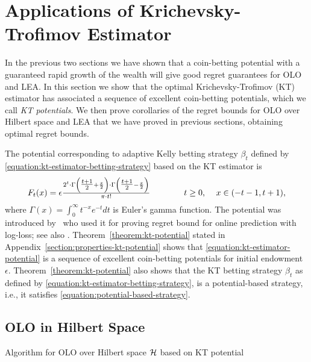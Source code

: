 \section{Applications of Krichevsky-Trofimov Estimator}
\label{section:kt-estimator}

In the previous two sections we have shown that a coin-betting potential with a
guaranteed rapid growth of the wealth will give good regret guarantees for
\ac{OLO} and \ac{LEA}. In this section we show that the optimal
Krichevsky-Trofimov (KT) estimator has associated a sequence of excellent
coin-betting potentials, which we call \emph{KT potentials}. We then prove
corollaries of the regret bounds for \ac{OLO} over Hilbert space and \ac{LEA}
that we have proved in previous sections, obtaining optimal regret bounds.

The potential corresponding to adaptive Kelly betting strategy
$\beta_t$ defined by \eqref{equation:kt-estimator-betting-strategy}
based on the KT estimator is
\begin{equation}
\label{equation:kt-estimator-potential}
F_t(x) = \epsilon \tfrac{2^t \cdot \Gamma \left( \tfrac{t+1}{2} + \frac{x}{2} \right) \cdot \Gamma \left( \tfrac{t+1}{2} - \frac{x}{2} \right)}{\pi \cdot t!}
\qquad \qquad \text{$t \ge 0$, \quad $x \in \left(-t-1, t+1\right)$,}
\end{equation}
where $\Gamma(x) = \int_0^\infty t^{-x} e^{-t} dt$ is Euler's gamma function.
The potential was introduced by~\citet{KrichevskyT81} who used it for proving
regret bound for online prediction with log-loss; see also \cite[Section
9.7]{Cesa-BianchiL06}.
Theorem~\ref{theorem:kt-potential} stated in
Appendix~\ref{section:properties-kt-potential} shows that
\eqref{equation:kt-estimator-potential} is a sequence of excellent coin-betting
potentials for initial endowment $\epsilon$. Theorem~\ref{theorem:kt-potential}
also shows that the KT betting strategy $\beta_t$ as defined by
\eqref{equation:kt-estimator-betting-strategy}, is a potential-based strategy,
i.e., it satisfies \eqref{equation:potential-based-strategy}.

\subsection{OLO in Hilbert Space}
\label{sec:kt-olo}

\begin{algorithm}[t]
\caption{Algorithm for OLO over Hilbert space $\mathcal{H}$ based on KT potential
\label{algorithm:kt-hilbert-space-olo}}
\begin{algorithmic}[1]
{
\ENDFOR
}
\end{algorithmic}
\end{algorithm}


